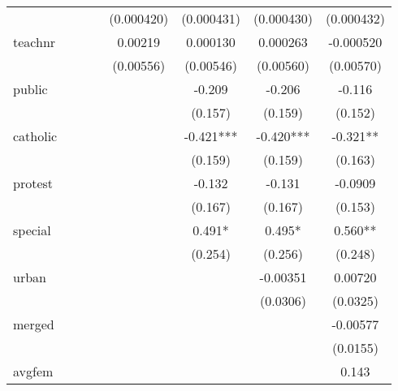 \begin{table}[htbp]
\begin{tabular}{l*{7}{c}}
            &               &               &               &  (0.000420)   &  (0.000431)   &  (0.000430)   &  (0.000432)   \\
[1em]
teachnr     &               &               &               &     0.00219   &    0.000130   &    0.000263   &   -0.000520   \\
            &               &               &               &   (0.00556)   &   (0.00546)   &   (0.00560)   &   (0.00570)   \\
[1em]
public      &               &               &               &               &      -0.209   &      -0.206   &      -0.116   \\
            &               &               &               &               &     (0.157)   &     (0.159)   &     (0.152)   \\
[1em]
catholic    &               &               &               &               &      -0.421***&      -0.420***&      -0.321** \\
            &               &               &               &               &     (0.159)   &     (0.159)   &     (0.163)   \\
[1em]
protest     &               &               &               &               &      -0.132   &      -0.131   &     -0.0909   \\
            &               &               &               &               &     (0.167)   &     (0.167)   &     (0.153)   \\
[1em]
special     &               &               &               &               &       0.491*  &       0.495*  &       0.560** \\
            &               &               &               &               &     (0.254)   &     (0.256)   &     (0.248)   \\
[1em]
urban       &               &               &               &               &               &    -0.00351   &     0.00720   \\
            &               &               &               &               &               &    (0.0306)   &    (0.0325)   \\
[1em]
merged      &               &               &               &               &               &               &    -0.00577   \\
            &               &               &               &               &               &               &    (0.0155)   \\
[1em]
avgfem      &               &               &               &               &               &               &       0.143   \\

\end{tabular}
\end{table}
